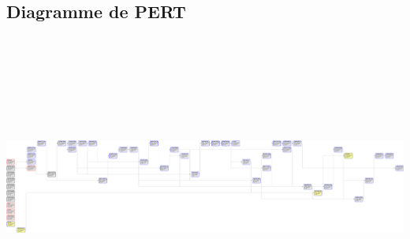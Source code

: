 \documentclass[a4paper,11pt]{article}
\begin{document}
\subsection{Diagramme de PERT}
\includegraphics[width=17cm, height=10cm]{Dessin_collaboratif_-_Diagramme_de_PERT.png}
\clearpage
\end{document}
